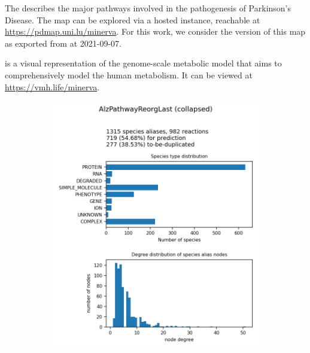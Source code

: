\documentclass[
	fontsize=10pt, %
	twoside=false, %
	secnumdepth=1, %
]{kaobook}
\begin{document}
The  \cite{fujita_IntegratingPathwaysParkinson_2014} describes the
major pathways involved in the pathogenesis of Parkinson's Disease. The map can
be explored via a hosted  instance, reachable at
\url{https://pdmap.uni.lu/minerva}. For this work, we consider the version of
this map as exported from  at 2021-09-07.

\cite{noronha_ReconMapInteractiveVisualization_2017}
is a visual representation of the genome-scale metabolic model
 \cite{thiele_CommunitydrivenGlobalReconstruction_2013} that aims
to comprehensively model the human metabolism. It can be viewed at \url{https://vmh.life/minerva}.

\begin{figure}[h]
  \centering
  \begin{subfigure}{0.32\textwidth}
    \includegraphics[width=\linewidth]{generated/AlzPathwayReorgLast.png}
  \end{subfigure} 
  \begin{subfigure}{0.32\textwidth}

\end{subfigure}
\end{figure}
\end{document}

